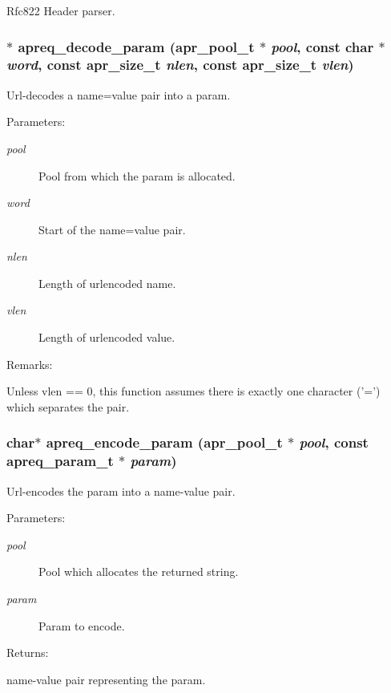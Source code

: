 Rfc822 Header parser. 
\subsubsection{$\ast$ apreq\_\-decode\_\-param ({\bf apr\_\-pool\_\-t} $\ast$ {\em pool}, const char $\ast$ {\em word}, const {\bf apr\_\-size\_\-t} {\em nlen}, const {\bf apr\_\-size\_\-t} {\em vlen})}\label{group__params_a10}


Url-decodes a name=value pair into a param. \begin{Desc}
\item[Parameters: ]\par
\begin{description}
\item[{\em 
pool}]Pool from which the param is allocated. \item[{\em 
word}]Start of the name=value pair. \item[{\em 
nlen}]Length of urlencoded name. \item[{\em 
vlen}]Length of urlencoded value. \end{description}
\end{Desc}
\begin{Desc}
\item[Remarks: ]\par
Unless vlen == 0, this function assumes there is exactly one character ('=') which separates the pair. \end{Desc}
\subsubsection{\setlength{\rightskip}{0pt plus 5cm}char$\ast$ apreq\_\-encode\_\-param ({\bf apr\_\-pool\_\-t} $\ast$ {\em pool}, const {\bf apreq\_\-param\_\-t} $\ast$ {\em param})}\label{group__params_a11}


Url-encodes the param into a name-value pair. \begin{Desc}
\item[Parameters: ]\par
\begin{description}
\item[{\em 
pool}]Pool which allocates the returned string. \item[{\em 
param}]Param to encode. \end{description}
\end{Desc}
\begin{Desc}
\item[Returns: ]\par
name-value pair representing the param. \end{Desc}
